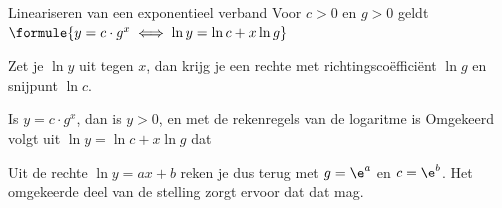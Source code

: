 \begin{theorie}
\begin{stelling}{Lineariseren van een exponentieel verband}
Voor $c > 0$ en $g > 0$ geldt \qquad $\formule{y = c \cdot g^x \iff \ln y = \ln c + x \ln g}$

\vspace{1mm}
Zet je $\ln y$ uit tegen $x$, dan krijg je een rechte met richtingscoëfficiënt $\ln g$ en snijpunt $\ln c$.
\end{stelling}

\begin{bewijs}
Is $y = c \cdot g^x$, dan is $y > 0$, en met de rekenregels van de logaritme is
Omgekeerd volgt uit $\ln y = \ln c + x \ln g$ dat
\end{bewijs}
\end{theorie}

Uit de rechte $\ln y = ax + b$ reken je dus terug met $g = \e^a$ en $c = \e^b$. Het omgekeerde deel van de stelling zorgt ervoor dat dat mag.

